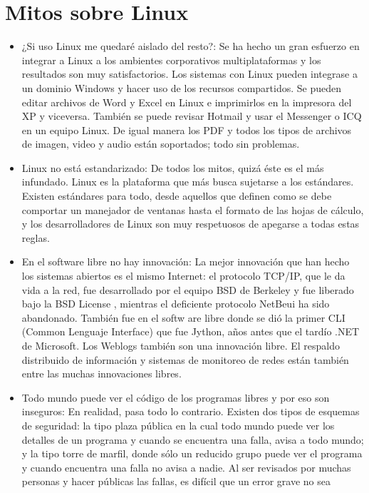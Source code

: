 \documentclass[11pt, a4paper]{report}
\begin{document}
\section*{Mitos sobre Linux}

\begin{itemize}
\item ¿Si uso Linux me quedaré aislado del resto?: Se ha hecho un gran esfuerzo
  en integrar a Linux a los ambientes corporativos multiplataformas y los
  resultados son muy satisfactorios. Los sistemas con Linux pueden integrase a
  un dominio Windows y hacer uso de los recursos compartidos. Se pueden editar
  archivos de Word y Excel en Linux e imprimirlos en la impresora del XP y
  viceversa. También se puede revisar Hotmail y usar el Messenger o ICQ en un
  equipo Linux. De igual manera los PDF y todos los tipos de archivos de
  imagen, video y audio están soportados; todo sin problemas.
\item Linux no está estandarizado: De todos los mitos, quizá éste es el más
  infundado. Linux es la plataforma que más busca sujetarse a los estándares.
  Existen estándares para todo, desde aquellos que definen como se debe
  comportar un manejador de ventanas hasta el formato de las hojas de cálculo,
  y los desarrolladores de Linux son muy respetuosos de apegarse a todas estas
  reglas.
\item En el software libre no hay innovación: La mejor innovación que han hecho
  los sistemas abiertos es el mismo Internet: el protocolo TCP/IP, que le da
  vida a la red, fue desarrollado por el equipo BSD de Berkeley y fue liberado
  bajo la BSD License , mientras el deficiente protocolo NetBeui ha sido
  abandonado. También fue en el softw are libre donde se dió la primer CLI
  (Common Lenguaje Interface) que fue Jython, años antes que el tardío .NET de
  Microsoft. Los Weblogs también son una innovación libre. El respaldo
  distribuido de información y sistemas de monitoreo de redes están también
  entre las muchas innovaciones libres.
\item Todo mundo puede ver el código de los programas libres y por eso son
  inseguros: En realidad, pasa todo lo contrario. Existen dos tipos de esquemas
  de seguridad: la tipo plaza pública en la cual todo mundo puede ver los
  detalles de un programa y cuando se encuentra una falla, avisa a todo mundo;
  y la tipo torre de marfil, donde sólo un reducido grupo puede ver el programa
  y cuando encuentra una falla no avisa a nadie. Al ser revisados por muchas
  personas y hacer públicas las fallas, es difícil que un error grave no sea

\end{itemize}
\end{document}
